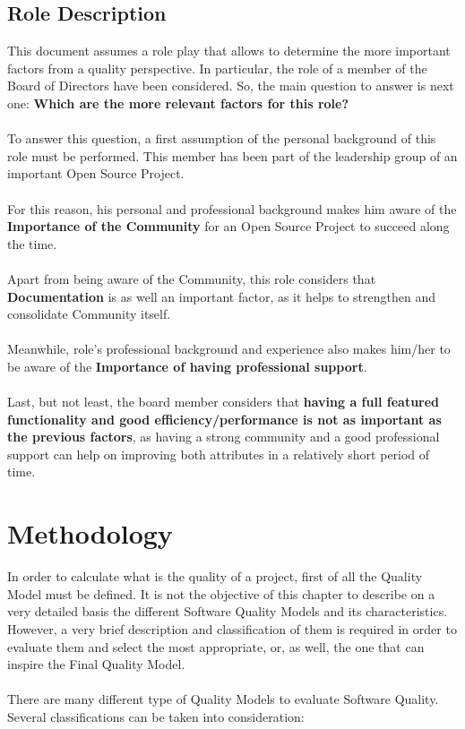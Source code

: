 \documentclass[11pt]{article}
\begin{document}
\subsection{Role Description} \label{sec:roledesc}
This document assumes a role play that allows to determine the more important factors from a quality perspective. In particular, the role of a member of the Board of Directors have been considered. So, the main question to answer is next one: \textbf{Which are the more relevant factors for this role?}\\
\\
To answer this question, a first assumption of the personal background of this role must be performed. This member has been part of the leadership group of an important Open Source Project.\\
\\
For this reason, his personal and professional background makes him aware of the \textbf{Importance of the Community} for an Open Source Project to succeed along the time.\\
\\
Apart from being aware of the Community, this role considers that \textbf{Documentation} is as well an important factor, as it helps to strengthen and consolidate Community itself.\\
\\
Meanwhile, role's professional background and experience also makes him/her to be aware of the \textbf{Importance of having professional support}.\\
\\
Last, but not least, the board member considers that \textbf{having a full featured functionality and good efficiency/performance is not as important as the previous factors}, as having a strong community and a good professional support can help on improving both attributes in a relatively short period of time.

\section{Methodology} \label{sec:methodology}
In order to calculate what is the quality of a project, first of all the Quality Model must be defined. It is not the objective of this chapter to describe on a very detailed basis the different Software Quality Models and its characteristics. However, a very brief description and classification of them is required in order to evaluate them and select the most appropriate, or, as well, the one that can inspire the Final Quality Model.\\
\\
There are many different type of Quality Models to evaluate Software Quality. Several classifications can be taken into consideration:
\end{document}
